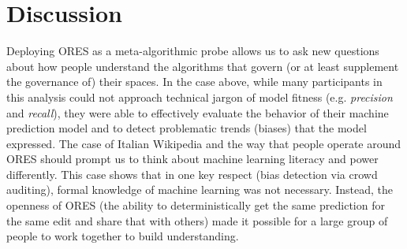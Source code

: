 \documentclass{sigchi-ext}
\begin{document}
\section{Discussion}
Deploying ORES as a meta-algorithmic probe allows us to ask new questions about how people understand the algorithms that govern (or at least supplement the governance of) their spaces.  In the case above, while many participants in this analysis could not approach technical jargon of model fitness (e.g. \emph{precision} and \emph{recall}), they were able to effectively evaluate the behavior of their machine prediction model and to detect problematic trends (biases) that the model expressed.  The case of Italian Wikipedia and the way that people operate around ORES should prompt us to think about machine learning literacy and power differently.  This case shows that in one key respect (bias detection via crowd auditing), formal knowledge of machine learning was not necessary.  Instead, the openness of ORES (the ability to deterministically get the same prediction for the same edit and share that with others) made it possible for a large group of people to work together to build understanding.




\end{document}
